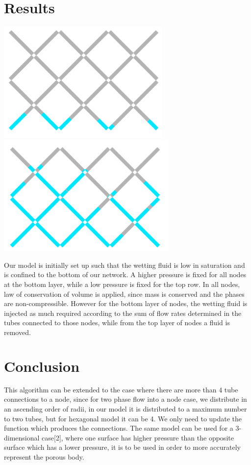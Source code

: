 \documentclass[12pt]{article}
\begin{document}
\section{Results}
	\includegraphics[height=6cm]{diagram/fig_initial-fill-distribution}
	\includegraphics[height=6cm]{diagram/fig_final-fill-distribution}
	
	Our model is initially set up such that the wetting fluid is low in saturation and is confined to the bottom of our network. A higher pressure is fixed for all nodes at the bottom layer, while a  low pressure is fixed for the top row. In all nodes, law of conservation of volume is applied, since mass is conserved and the phases are non-compressible. However for the bottom layer of nodes, the wetting fluid is injected as much required according to the sum of flow rates determined in the tubes connected to those nodes, while from the top layer of nodes a fluid is removed.
	\section{Conclusion}
	This algorithm can be extended to the case where there are more than 4 tube connections to a node, since for two phase flow into a node case, we distribute in an ascending order of radii, in our model it is distributed to a maximum number to two tubes, but for hexagonal model it can be 4. We only need to update the function which produces the connections. The same model can be used for a 3-dimensional case[2], where one surface has higher pressure than the opposite surface which has a lower pressure, it is to be used in order to more accurately represent the porous body.
\end{document}
